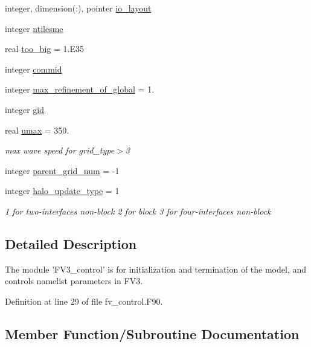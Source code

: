 \begin{DoxyCompactItemize}
\item 
integer, dimension(\-:), pointer \hyperlink{classfv__control__mod_a98f797f3a34e834e28ecad3a99ea2a06}{io\-\_\-layout}
\item 
integer \hyperlink{classfv__control__mod_a3d3dfa096dc269b05b2969281d35c453}{ntilesme}
\item 
real \hyperlink{classfv__control__mod_a6b6be52e25375aff31a0cf50bfada435}{too\-\_\-big} = 1.E35
\item 
integer \hyperlink{classfv__control__mod_ab89d522e6d2e7e81dd9adc88477c54d6}{commid}
\item 
integer \hyperlink{classfv__control__mod_a52a5e694a3dff2419b9cab131ffbdcbb}{max\-\_\-refinement\-\_\-of\-\_\-global} = 1.
\item 
integer \hyperlink{classfv__control__mod_a5604520a8bd260a859a6ec9dbaa60ad8}{gid}
\item 
real \hyperlink{classfv__control__mod_a6da7ed00f053d3675e9de3748bf8931e}{umax} = 350.
\begin{DoxyCompactList}\small\item\em max wave speed for grid\-\_\-type$>$3 \end{DoxyCompactList}\item 
integer \hyperlink{classfv__control__mod_ab921b928551b09feff4a8f27ab427293}{parent\-\_\-grid\-\_\-num} = -\/1
\item 
integer \hyperlink{classfv__control__mod_a1806aedab0a728a6bf6b8fed41e121a9}{halo\-\_\-update\-\_\-type} = 1
\begin{DoxyCompactList}\small\item\em 1 for two-\/interfaces non-\/block 2 for block 3 for four-\/interfaces non-\/block \end{DoxyCompactList}\end{DoxyCompactItemize}


\subsection{Detailed Description}
The module 'F\-V3\-\_\-control' is for initialization and termination of the model, and controls namelist parameters in F\-V3. 

Definition at line 29 of file fv\-\_\-control.\-F90.



\subsection{Member Function/\-Subroutine Documentation}
